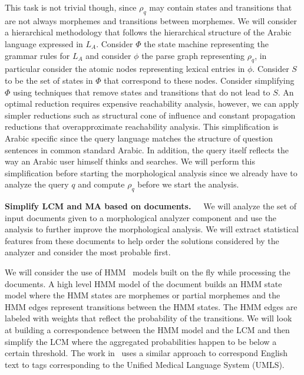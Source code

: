 \documentclass[12pt]{article}
\begin{document}
This task is not trivial though, since $\rho_q$ may contain
states and transitions that are not always morphemes and 
transitions between morphemes. 
We will consider a hierarchical methodology that follows 
the hierarchical structure of the Arabic language expressed
in $L_A$. 
Consider $\Phi$ the state machine representing the grammar 
rules for $L_A$ and consider $\phi$ the parse graph 
representing $\rho_q$, in particular consider the atomic nodes 
representing lexical entries in $\phi$. 
Consider $S$ to be the set of states in $\Phi$ that 
correspond to these nodes. 
Consider simplifying $\Phi$ using techniques that remove 
states and transitions that do not lead to $S$. 
An optimal reduction requires expensive reachability 
analysis, however, we can apply simpler reductions such 
as structural cone of influence and
constant propagation reductions that overapproximate
reachability analysis. 
This simplification is Arabic specific since
the query language matches the structure of question sentences 
in common standard Arabic.
In addition, the query itself reflects the way an Arabic user
himself thinks and searches. 
We will perform this simplification before starting the 
morphological analysis since we already have to analyze
the query $q$ and compute $\rho_q$ before we start
the analysis. 

{\bf Simplify LCM and MA based on documents.~~}
We will analyze the set of input documents given to a
morphological analyzer component and use the analysis
to further improve the morphological analysis. 
We will extract statistical features from these documents 
to help order the solutions considered by the analyzer
and consider the most probable first. 

We will consider the use of HMM~\cite{JanHMM06}
models built on the fly while processing the documents.
A high level HMM model of the document builds an HMM state
model where the HMM states are morphemes or partial 
morphemes and the HMM edges represent transitions between
the HMM states. 
The HMM edges are labeled with weights that reflect the
probability of the transitions.
We will look at building a correspondence between 
the HMM model and the LCM and then simplify the 
LCM where the aggregated probabilities happen to be
below a certain threshold. 
The work in~\cite{JanHMM06} uses a similar approach
to correspond English text to tags corresponding to the 
Unified Medical Language System (UMLS).
\end{document}
